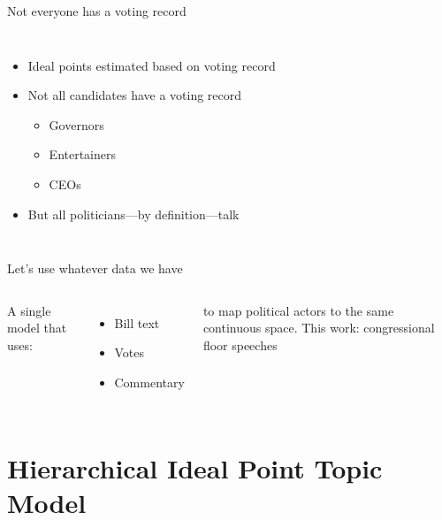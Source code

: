 \documentclass[compress]{beamer}
\begin{document}
\begin{frame}{Not everyone has a voting record}

  \begin{columns}

    \begin{itemize}
      \item Ideal points estimated based on voting record
      \item Not all candidates have a voting record
        \begin{itemize}
          \item Governors
          \item Entertainers
          \item CEOs
        \end{itemize}
        \pause
       \item But all politicians---by definition---talk
      \end{itemize}
  \end{columns}

\end{frame}


\begin{frame}{Let's use whatever data we have}

\begin{columns}
  A single model that uses:
  \begin{itemize}
    \item Bill text
    \item Votes
    \item Commentary
  \end{itemize}
  to map political actors to the same continuous space.
  \pause
  This work: congressional floor speeches
\end{columns}
\end{frame}

\section{Hierarchical Ideal Point Topic Model}


\end{document}
